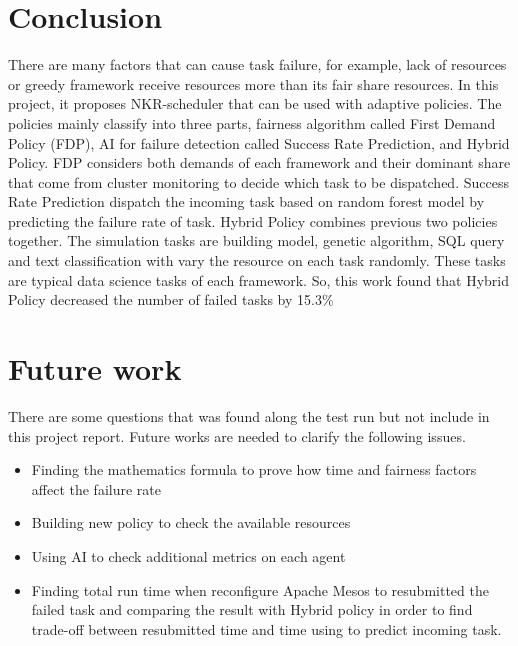 \documentclass[12pt,oneside,openright,a4paper]{cpe-english-project}
\begin{document}
\section{Conclusion}
\hspace{10mm}There are many factors that can cause task failure, for example, lack of resources or greedy framework receive resources more than its fair share resources. In this project, it proposes NKR-scheduler that can be used with adaptive policies. The policies mainly classify into three parts, fairness algorithm called First Demand Policy (FDP), AI for failure detection called Success Rate Prediction, and Hybrid Policy. FDP considers both demands of each framework and their dominant share that come from cluster monitoring to decide which task to be dispatched. Success Rate Prediction dispatch the incoming task based on random forest model by predicting the failure rate of task. Hybrid Policy combines previous two policies together. The simulation tasks are building model, genetic algorithm, SQL query and text classification with vary the resource on each task randomly. These tasks are typical data science tasks of each framework. So, this work found that Hybrid Policy decreased the number of failed tasks by 15.3\%

\newpage
\section{Future work}
\hspace{10mm}There are some questions that was found along the test run but not include in this project report. Future works are needed to clarify the following issues. 
\begin{itemize}
  \item Finding the mathematics formula to prove how time and fairness factors affect the failure rate
  \item Building new policy to check the available resources
  \item Using AI to check additional metrics on each agent
  \item Finding total run time when reconfigure Apache Mesos to resubmitted the failed task and comparing the result with Hybrid policy in order to find trade-off between resubmitted time and time using to predict incoming task. 
\end{itemize}


\nocite{*}


\end{document}
